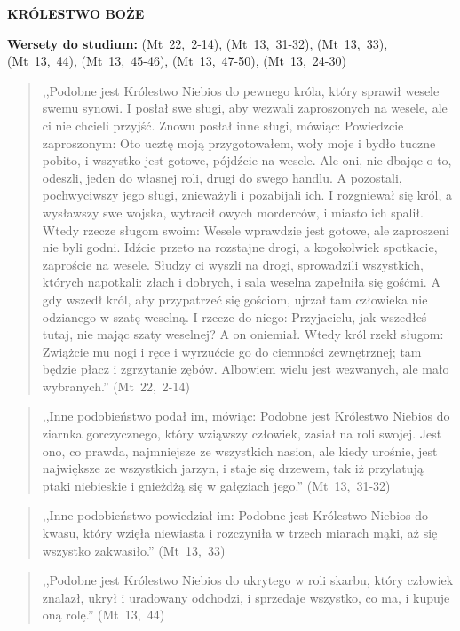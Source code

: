 \documentclass[10pt,a4paper,oneside]{article}
\begin{document}
\centerline{\textbf{\MakeUppercase{Królestwo Boże}}}
\begin{center}
\textbf{Wersety do studium:} \mbox{(Mt 22, 2-14)}, \mbox{(Mt 13, 31-32)}, \mbox{(Mt 13, 33)}, \mbox{(Mt 13, 44)}, \mbox{(Mt 13, 45-46)}, \mbox{(Mt 13, 47-50)}, \mbox{(Mt 13, 24-30)}
\end{center}
\begin{quote}
,,Podobne jest Królestwo Niebios do pewnego króla, który sprawił wesele swemu synowi. I posłał swe sługi, aby wezwali zaproszonych na wesele, ale ci nie chcieli przyjść. Znowu posłał inne sługi, mówiąc: Powiedzcie zaproszonym: Oto ucztę moją przygotowałem, woły moje i bydło tuczne pobito, i wszystko jest gotowe, pójdźcie na wesele. Ale oni, nie dbając o to, odeszli, jeden do własnej roli, drugi do swego handlu. A pozostali, pochwyciwszy jego sługi, znieważyli i pozabijali ich. I rozgniewał się król, a wysławszy swe wojska, wytracił owych morderców, i miasto ich spalił. Wtedy rzecze sługom swoim: Wesele wprawdzie jest gotowe, ale zaproszeni nie byli godni. Idźcie przeto na rozstajne drogi, a kogokolwiek spotkacie, zaproście na wesele. Słudzy ci wyszli na drogi, sprowadzili wszystkich, których napotkali: złach i dobrych, i sala weselna zapełniła się gośćmi. A gdy wszedł król, aby przypatrzeć się gościom, ujrzał tam człowieka nie odzianego w szatę weselną. I rzecze do niego: Przyjacielu, jak wszedłeś tutaj, nie mając szaty weselnej? A on oniemiał. Wtedy król rzekł sługom: Zwiążcie mu nogi i ręce i wyrzućcie go do ciemności zewnętrznej; tam będzie płacz i zgrzytanie zębów. Albowiem wielu jest wezwanych, ale mało wybranych.'' \mbox{(Mt 22, 2-14)}
\end{quote}
\begin{quote}
,,Inne podobieństwo podał im, mówiąc: Podobne jest Królestwo Niebios do ziarnka gorczycznego, który wziąwszy człowiek, zasiał na roli swojej. Jest ono, co prawda, najmniejsze ze wszystkich nasion, ale kiedy urośnie, jest największe ze wszystkich jarzyn, i staje się drzewem, tak iż przylatują ptaki niebieskie i gnieżdżą się w gałęziach jego.'' \mbox{(Mt 13, 31-32)}
\end{quote}
\begin{quote}
,,Inne podobieństwo powiedział im: Podobne jest Królestwo Niebios do kwasu, który wzięła niewiasta i rozczyniła w trzech miarach mąki, aż się wszystko zakwasiło.'' \mbox{(Mt 13, 33)}
\end{quote}
\begin{quote}
,,Podobne jest Królestwo Niebios do ukrytego w roli skarbu, który człowiek znalazł, ukrył i uradowany odchodzi, i sprzedaje wszystko, co ma, i kupuje oną rolę.'' \mbox{(Mt 13, 44)}
\end{quote}
\end{document}

